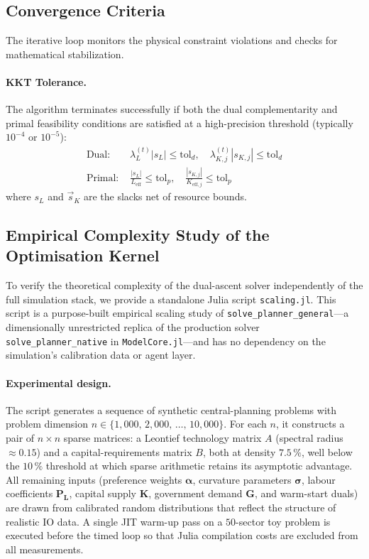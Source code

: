 \subsection{Convergence Criteria}

The iterative loop monitors the physical constraint violations and checks for mathematical stabilization.

\paragraph{KKT Tolerance.}
The algorithm terminates successfully if both the dual complementarity and primal feasibility conditions are satisfied at a high-precision threshold (typically $10^{-4}$ or $10^{-5}$):
\begin{align}
  \text{Dual: } & \lambda_{L}^{(t)} |s_L| \leq \text{tol}_d, \quad \lambda_{K,j}^{(t)}|s_{K,j}| \leq \text{tol}_d \\
  \text{Primal: } & \frac{|s_L|}{L_{\text{eff}}} \leq \text{tol}_p, \quad \frac{| s_{K,j}|}{K_{\text{eff},j}} \leq \text{tol}_p
\end{align}
where $s_L$ and $\vec{s}_K$ are the slacks net of resource bounds.

\subsection{Empirical Complexity Study of the Optimisation Kernel}
\label{subsec:scaling}

To verify the theoretical complexity of the dual-ascent solver independently of
the full simulation stack, we provide a standalone Julia script \texttt{scaling.jl}.
This script is a purpose-built empirical scaling study of
\texttt{solve\_planner\_general}---a dimensionally unrestricted replica of the
production solver \texttt{solve\_planner\_native} in \texttt{ModelCore.jl}---and
has no dependency on the simulation's calibration data or agent layer.

\paragraph{Experimental design.}
The script generates a sequence of synthetic central-planning problems with
problem dimension $n \in \{1{,}000,\, 2{,}000,\, \ldots,\, 10{,}000\}$.
For each $n$, it constructs a pair of $n \times n$ sparse matrices: a Leontief
technology matrix $A$ (spectral radius $\approx 0.15$) and a capital-requirements
matrix $B$, both at density $7.5\,\%$, well below the $10\,\%$ threshold at which
sparse arithmetic retains its asymptotic advantage.  All remaining inputs
(preference weights $\boldsymbol{\alpha}$, curvature parameters $\boldsymbol{\sigma}$,
labour coefficients $\boldsymbol{P_L}$,
capital supply $\boldsymbol{K}$, government demand $\boldsymbol{G}$, and
warm-start duals) are drawn from calibrated random distributions that reflect the
structure of realistic IO data.  A single JIT warm-up pass on a $50$-sector toy
problem is executed before the timed loop so that Julia compilation costs are
excluded from all measurements.

